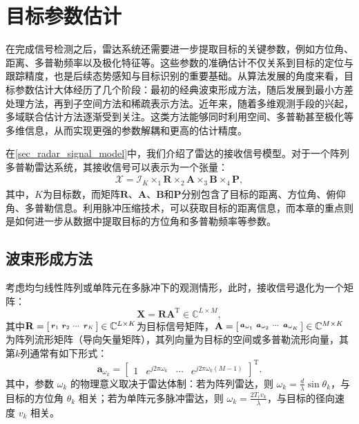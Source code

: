 \chapter{目标参数估计}

在完成信号检测之后，雷达系统还需要进一步提取目标的关键参数，例如方位角、距离、多普勒频率以及极化特征等。这些参数的准确估计不仅关系到目标的定位与跟踪精度，也是后续态势感知与目标识别的重要基础。从算法发展的角度来看，目标参数估计大体经历了几个阶段：最初的经典波束形成方法，随后发展到最小方差处理方法，再到子空间方法和稀疏表示方法。近年来，随着多维观测手段的兴起，多域联合估计方法逐渐受到关注。这类方法能够同时利用空间、多普勒甚至极化等多维信息，从而实现更强的参数解耦和更高的估计精度。

在\cref{sec_radar_signal_model}中，我们介绍了雷达的接收信号模型。对于一个阵列多普勒雷达系统，其接收信号可以表示为一个张量：
\[
    \begin{split}
        \mathcal{X} = \mathcal{I}_K \times_1 \mathbf{R} \times_2 \mathbf{A} \times_3 \mathbf{B} \times_4 \mathbf{P},
    \end{split}
\]
其中，\( K \)为目标数，而矩阵\( \mathbf{R} \)、\( \mathbf{A} \)、\( \mathbf{B} \)和\( \mathbf{P} \)分别包含了目标的距离、方位角、俯仰角、多普勒信息。利用脉冲压缩技术，可以获取目标的距离信息，而本章的重点则是如何进一步从数据中提取目标的方位角和多普勒频率等参数。

\section{波束形成方法}
考虑均匀线性阵列或单阵元在多脉冲下的观测情形，此时，接收信号退化为一个矩阵：
\[
    \mathbf{X} = \mathbf{R} \mathbf{A}^{\mathrm{T}} \in \mathbb{C}^{L \times M},
\]
其中\( \mathbf{R} = \begin{bsmallmatrix} \boldsymbol{r}_1 & \boldsymbol{r}_2 & \cdots & \boldsymbol{r}_K \end{bsmallmatrix} \in \mathbb{C}^{L \times K} \)为目标信号矩阵，\( \mathbf{A} = \begin{bsmallmatrix} \boldsymbol{a}_{\omega_1} & \boldsymbol{a}_{\omega_2} & \cdots & \boldsymbol{a}_{\omega_K} \end{bsmallmatrix} \in \mathbb{C}^{M \times K} \)为阵列流形矩阵（导向矢量矩阵），其列向量为目标的空间或多普勒流形向量，其第\( k \)列通常有如下形式：
\[
    \bm{a}_{\omega_k} = \begin{bmatrix}
        1 & e^{j 2 \pi \omega_k} & \cdots & e^{j 2 \pi \omega_k (M-1)}
    \end{bmatrix}^{\mathrm{T}}.
\]
其中，参数 $\omega_k$ 的物理意义取决于雷达体制：若为阵列雷达，则 $\omega_k = \tfrac{d}{\lambda}\sin \theta_k$，与目标的方位角 $\theta_k$ 相关；若为单阵元多脉冲雷达，则 $\omega_k = \tfrac{2 T_r v_k}{\lambda}$，与目标的径向速度 $v_k$ 相关。

